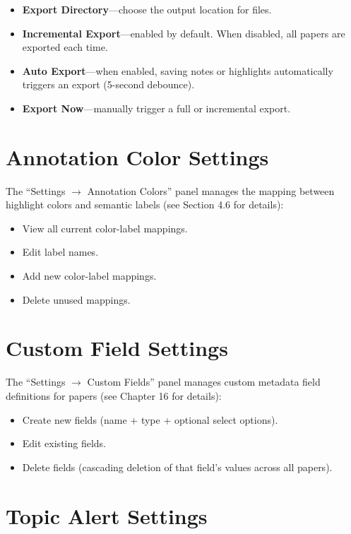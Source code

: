 \begin{itemize}
  \item \textbf{Export Directory}---choose the output location for  files.
  \item \textbf{Incremental Export}---enabled by default. When disabled, all papers are
    exported each time.
  \item \textbf{Auto Export}---when enabled, saving notes or highlights automatically
    triggers an export (5-second debounce).
  \item \textbf{Export Now}---manually trigger a full or incremental export.
\end{itemize}

\section{Annotation Color Settings}

The ``Settings $\rightarrow$ Annotation Colors'' panel manages the mapping between
highlight colors and semantic labels (see Section 4.6 for details):

\begin{itemize}
  \item View all current color-label mappings.
  \item Edit label names.
  \item Add new color-label mappings.
  \item Delete unused mappings.
\end{itemize}

\section{Custom Field Settings}

The ``Settings $\rightarrow$ Custom Fields'' panel manages custom metadata field
definitions for papers (see Chapter 16 for details):

\begin{itemize}
  \item Create new fields (name + type + optional select options).
  \item Edit existing fields.
  \item Delete fields (cascading deletion of that field's values across all papers).
\end{itemize}

\section{Topic Alert Settings}

